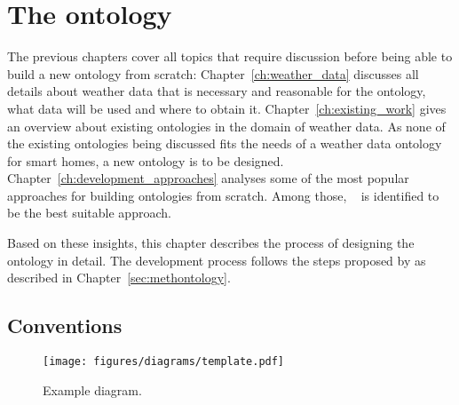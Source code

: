\chapter{The \smarthomeweather ontology}
\label{ch:smarthomeweather_ontology}





The previous chapters cover all topics that require discussion before being able to build a new ontology from scratch: Chapter~\ref{ch:weather_data} discusses all details about weather data that is necessary and reasonable for the \smarthomeweather ontology, what data will be used and where to obtain it. Chapter~\ref{ch:existing_work} gives an overview about existing ontologies in the domain of weather data. As none of the existing ontologies being discussed fits the needs of a weather data ontology for smart homes, a new ontology is to be designed. Chapter~\ref{ch:development_approaches} analyses some of the most popular approaches for building ontologies from scratch. Among those, \methontology~\cite{Methontology} is identified to be the best suitable approach.

Based on these insights, this chapter describes the process of designing the \smarthomeweather ontology in detail. The development process follows the steps proposed by \methontology as described in Chapter~\ref{sec:methontology}.

\section{Conventions}
\label{sec:ontology_conventions}

\begin{figure}
  \texttt{[image: figures/diagrams/template.pdf]}
  \caption[Example diagram]{Example diagram.}
  \label{fig:diagram_example}
\end{figure}


